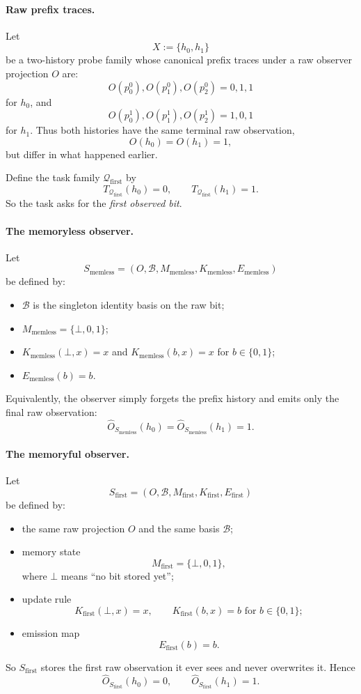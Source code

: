\documentclass[11pt,twoside]{article}
\theoremstyle{definition}
\begin{document}
\paragraph{Raw prefix traces.}
Let
\[
  X := \{ h_0, h_1 \}
\]
be a two-history probe family whose canonical prefix traces under a raw observer projection \(O\) are:
\[
  O(p^0_0), O(p^0_1), O(p^0_2) = 0,1,1
\]
for \(h_0\), and
\[
  O(p^1_0), O(p^1_1), O(p^1_2) = 1,0,1
\]
for \(h_1\).
Thus both histories have the same terminal raw observation,
\[
  O(h_0)=O(h_1)=1,
\]
but differ in what happened earlier.

Define the task family \(\mathcal{Q}_{\mathrm{first}}\) by
\[
  T_{\mathcal{Q}_{\mathrm{first}}}(h_0)=0,
  \qquad
  T_{\mathcal{Q}_{\mathrm{first}}}(h_1)=1.
\]
So the task asks for the \emph{first observed bit}.

\paragraph{The memoryless observer.}
Let
\[
  S_{\mathrm{memless}}
  =
  (O,\mathcal{B},M_{\mathrm{memless}},K_{\mathrm{memless}},E_{\mathrm{memless}})
\]
be defined by:
\begin{itemize}[leftmargin=*]
  \item \(\mathcal{B}\) is the singleton identity basis on the raw bit;
  \item \(M_{\mathrm{memless}}=\{\bot,0,1\}\);
  \item \(K_{\mathrm{memless}}(\bot,x)=x\) and \(K_{\mathrm{memless}}(b,x)=x\) for \(b\in\{0,1\}\);
  \item \(E_{\mathrm{memless}}(b)=b\).
\end{itemize}
Equivalently, the observer simply forgets the prefix history and emits only the final raw observation:
\[
  \widehat{O}_{S_{\mathrm{memless}}}(h_0)
  =
  \widehat{O}_{S_{\mathrm{memless}}}(h_1)
  =
  1.
\]

\paragraph{The memoryful observer.}
Let
\[
  S_{\mathrm{first}}
  =
  (O,\mathcal{B},M_{\mathrm{first}},K_{\mathrm{first}},E_{\mathrm{first}})
\]
be defined by:
\begin{itemize}[leftmargin=*]
  \item the same raw projection \(O\) and the same basis \(\mathcal{B}\);
  \item memory state
        \[
          M_{\mathrm{first}}=\{\bot,0,1\},
        \]
        where \(\bot\) means ``no bit stored yet'';
  \item update rule
        \[
          K_{\mathrm{first}}(\bot,x)=x,
          \qquad
          K_{\mathrm{first}}(b,x)=b \text{ for } b\in\{0,1\};
        \]
  \item emission map
        \[
          E_{\mathrm{first}}(b)=b.
        \]
\end{itemize}
So \(S_{\mathrm{first}}\) stores the first raw observation it ever sees and never overwrites it. Hence
\[
  \widehat{O}_{S_{\mathrm{first}}}(h_0)=0,
  \qquad
  \widehat{O}_{S_{\mathrm{first}}}(h_1)=1.
\]
\end{document}
